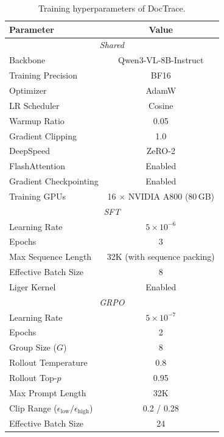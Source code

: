\documentclass[letterpaper]{article} %
\begin{document}
\begin{table}[t]
\centering

\begin{tabular}{lc}
\toprule
  \textbf{Parameter} & \textbf{Value} \\
  \midrule
  \multicolumn{2}{c}{\textit{Shared}} \\
  \midrule
  Backbone              & Qwen3-VL-8B-Instruct \\
  Training Precision    & BF16 \\
  Optimizer             & AdamW \\
  LR Scheduler          & Cosine \\
  Warmup Ratio          & 0.05 \\
  Gradient Clipping     & 1.0 \\
  DeepSpeed             & ZeRO-2 \\
  FlashAttention        & Enabled \\
  Gradient Checkpointing& Enabled \\
  Training GPUs         & 16 $\times$ NVIDIA A800 (80\,GB) \\
  \midrule
  \multicolumn{2}{c}{\textit{SFT}} \\
  \midrule
  Learning Rate         & $5\times10^{-6}$ \\
  Epochs                & 3 \\
  Max Sequence Length   & 32K (with sequence packing) \\
  Effective Batch Size  & 8 \\
  Liger Kernel          & Enabled \\
  \midrule
  \multicolumn{2}{c}{\textit{GRPO}} \\
  \midrule
  Learning Rate         & $5\times10^{-7}$ \\
  Epochs                & 2 \\
  Group Size ($G$)      & 8 \\
  Rollout Temperature   & 0.8 \\
  Rollout Top-$p$       & 0.95 \\
  Max Prompt Length     & 32K \\
  Clip Range ($\epsilon_{\text{low}}/\epsilon_{\text{high}}$) & 0.2 / 0.28 \\
  Effective Batch Size  & 24 \\
\bottomrule
\end{tabular}

\caption{Training hyperparameters of DocTrace.}
\label{tab:hyperparameters}
\end{table}
\end{document}
